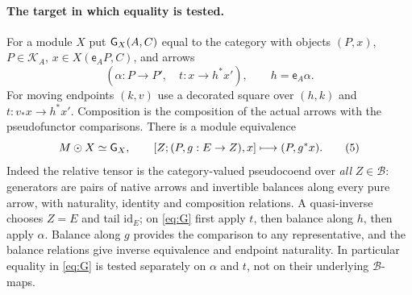 \documentclass[11pt]{article}
\theoremstyle{definition}\newtheorem{definition}[theorem]{Definition}
\newcommand{\B}{\mathcal B}\newcommand{\J}{\mathcal J}
\newcommand{\K}{\mathcal K}\newcommand{\Lcat}{\mathcal L}
\newcommand{\id}{\mathrm{id}}\newcommand{\op}{\mathrm{op}}\newcommand{\dom}{\mathrm{dom}}
\newcommand{\ea}{\mathsf e}\newcommand{\un}{\mathbf1}\newcommand{\Tt}{\overline T}
\begin{document}
\paragraph{The target in which equality is tested.}
For a module $X$ put $\mathsf G_X(A,C)$ equal to the category with objects
$(P,x)$, $P\in\K_A$, $x\in X(\ea_AP,C)$, and arrows
\[
 (\alpha:P\to P',\quad t:x\to h^*x'),\qquad h=\ea_A\alpha.
 \tag{4}\label{eq:G}
\]
For moving endpoints $(k,v)$ use a decorated square over $(h,k)$
and $t:v_*x\to h^*x'$. Composition is the composition of the actual
arrows with the pseudofunctor comparisons. There is a module equivalence
\[
 M\odot X\simeq \mathsf G_X,\qquad
 [Z;(P,g:E\to Z),x]\longmapsto(P,g^*x).
 \tag{5}\label{eq:normal}
\]
Indeed the relative tensor is the category-valued pseudocoend over
\emph{all} $Z\in\B$: generators are pairs of native arrows and invertible
balances along every pure arrow, with naturality, identity and composition
relations. A quasi-inverse chooses $Z=E$ and tail $\id_E$; on
\eqref{eq:G} first apply $t$, then balance along $h$, then apply $\alpha$.
Balance along $g$ provides the comparison to any representative, and the
balance relations give inverse equivalence and endpoint naturality.
In particular equality in \eqref{eq:G} is tested separately on
$\alpha$ and $t$, not on their underlying $\B$-maps.
\end{document}
